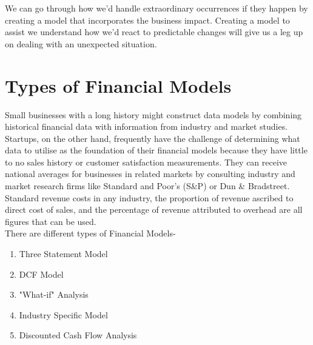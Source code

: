 \documentclass{article}
\begin{document}
We can go through how we'd handle extraordinary occurrences if they happen by creating a model that incorporates the business impact. Creating a model to assist we understand how we'd react to predictable changes will give us a leg up on dealing with an unexpected situation.

\section{Types of Financial Models}
Small businesses with a long history might construct data models by combining historical financial data with information from industry and market studies. Startups, on the other hand, frequently have the challenge of determining what data to utilise as the foundation of their financial models because they have little to no sales history or customer satisfaction measurements. They can receive national averages for businesses in related markets by consulting industry and market research firms like Standard and Poor's (S&P) or Dun & Bradstreet. Standard revenue costs in any industry, the proportion of revenue ascribed to direct cost of sales, and the percentage of revenue attributed to overhead are all figures that can be used.
\\
There are different types of Financial Models-
\begin{enumerate}
    \item Three Statement Model
    \item DCF Model
    \item "What-if" Analysis
    \item Industry Specific Model
    \item Discounted Cash Flow Analysis
\end{enumerate}
\end{document}
